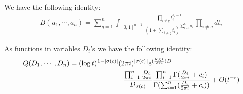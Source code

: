 \documentclass[10pt,a4paper]{amsart}
\begin{document}
\begin{lemma}\label{identity of beta function}
We have the following identity:
	\begin{align*}
		B(a_1,\cdots,a_n)=\sum_{q=1}^n \int_{[0,1]^{n-1}}\frac{\prod_{i\not=q}t_i^{a_i-1}}{\left(1+\sum_{i\not=q}t_i\right)^{\sum_{i=1}^n a_i}}\prod_{i\not=q}dt_i
	\end{align*}
\end{lemma}

\begin{proposition}\label{equality of functions}
	As functions in variables $D_i$'s we have the following identity:
	\begin{align*}
		Q(D_1,\cdots,D_n)=(\log t)^{1-|\sigma(c)|}&(2\pi {\rm i})^{|\sigma(c)|}e^{(\frac{\log t}{2\pi {\rm i}}) D}\\
		&\cdot\frac{\prod_{i=1}^n \frac{D_i}{2\pi{\rm i}}}{D_{\sigma(c)}}\frac{\prod_{i=1}^n\Gamma(\frac{D_i}{2\pi{\rm i}}+c_i)}{\Gamma(\sum_{i=1}^n(\frac{D_i}{2\pi{\rm i}}+c_i))}+O(t^{-\epsilon})
	\end{align*}
\end{proposition}
\end{document}
